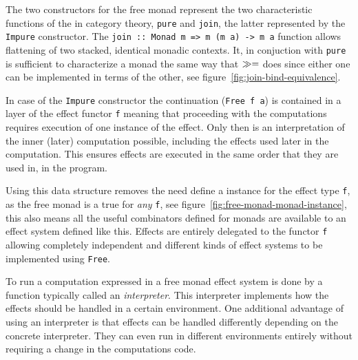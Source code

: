 The two constructors for the free monad represent the two
characteristic functions of the \Monad{} in category theory,
\texttt{pure} and \texttt{join}, the latter represented by the
\texttt{Impure} constructor. The \texttt{join :: Monad m => m (m a) ->
  m a} function allows flattening of two stacked, identical monadic
contexts. It, in conjuction with \texttt{pure} is sufficient to
characterize a monad the same way that $\gg=$ does since either one
can be implemented in terms of the other, see
figure~\ref{fig:join-bind-equivalence}.

In case of the \texttt{Impure} constructor the continuation
(\texttt{Free f a}) is contained in a layer of the effect functor
\texttt{f} meaning that proceeding with the computations requires
execution of one instance of the effect. Only then is an
interpretation of the inner (later) computation possible, including
the effects used later in the computation. This ensures effects are
executed in the same order that they are used in, in the program.

Using this data structure removes the need define a \Monad{} instance
for the effect type \texttt{f}, as the free monad is a true \Monad{}
for \emph{any} \Functor{} \texttt{f}, see
figure~\ref{fig:free-monad-monad-instance}, this also means all the
useful combinators defined for monads are available to an effect
system defined like this. Effects are entirely delegated to the
functor \texttt{f} allowing completely independent and different kinds
of effect systems to be implemented using \texttt{Free}.

To run a computation expressed in a free monad effect system is done
by a function typically called an \emph{interpreter}. This interpreter
implements how the effects should be handled in a certain
environment. One additional advantage of using an interpreter is that
effects can be handled differently depending on the concrete
interpreter. They can even run in different environments entirely
without requiring a change in the computations code.


